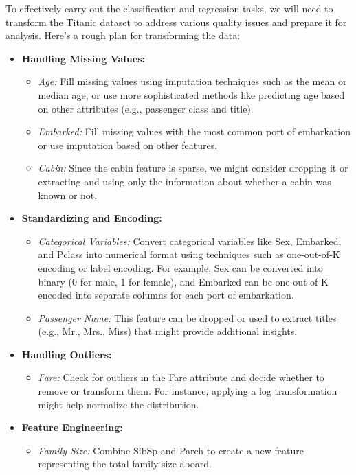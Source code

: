 \documentclass[twoside,11pt]{article}
\begin{document}
To effectively carry out the classification and regression tasks, we will need to transform the Titanic dataset to address various quality issues and prepare it for analysis. Here’s a rough plan for transforming the data:

\begin{itemize}
    \item \textbf{Handling Missing Values:}
    \begin{itemize}
        \item \textit{Age:} Fill missing values using imputation techniques such as the mean or median age, or use more sophisticated methods like predicting age based on other attributes (e.g., passenger class and title).
        \item \textit{Embarked:} Fill missing values with the most common port of embarkation or use imputation based on other features.
        \item \textit{Cabin:} Since the cabin feature is sparse, we might consider dropping it or extracting and using only the information about whether a cabin was known or not.
    \end{itemize}
    \item \textbf{Standardizing and Encoding:}
    \begin{itemize}
        \item \textit{Categorical Variables:} Convert categorical variables like Sex, Embarked, and Pclass into numerical format using techniques such as one-out-of-K encoding or label encoding. For example, Sex can be converted into binary (0 for male, 1 for female), and Embarked can be one-out-of-K encoded into separate columns for each port of embarkation.
        \item \textit{Passenger Name:} This feature can be dropped or used to extract titles (e.g., Mr., Mrs., Miss) that might provide additional insights.
    \end{itemize}
    \item \textbf{Handling Outliers:}
    \begin{itemize}
        \item \textit{Fare:} Check for outliers in the Fare attribute and decide whether to remove or transform them. For instance, applying a log transformation might help normalize the distribution.
    \end{itemize}
    \item \textbf{Feature Engineering:}
    \begin{itemize}
        \item \textit{Family Size:} Combine SibSp and Parch to create a new feature representing the total family size aboard.

\end{itemize}
\end{itemize}
\end{document}
